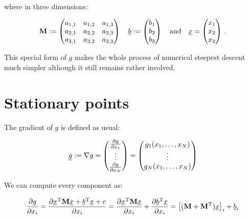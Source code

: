 \documentclass[a4paper,10pt]{article}
\begin{document}
where in three dimensions:

\begin{equation}
  \mathbf{M} :=
 \begin{pmatrix}
  a_{1,1} & a_{1,2} & a_{1,3} \\
  a_{2,1} & a_{2,2} & a_{2,3} \\
  a_{3,1} & a_{3,2} & a_{3,3} \\
 \end{pmatrix}
 \quad
 \underline{b} :=
 \begin{pmatrix}
  b_1 \\ b_2 \\ b_3
 \end{pmatrix}
 \quad \mathrm{and} \quad
 \underline{x} =
 \begin{pmatrix}
  x_1 \\ x_2 \\ x_3
 \end{pmatrix} \,.
\end{equation}

This special form of $g$ makes the whole process of numerical steepest
descent much simpler although it still remains rather involved.


\section{Stationary points}

The gradient of $g$ is defined as usual:

\begin{equation}
 \underline{g} := \nabla g =
 \begin{pmatrix}
  \frac{\partial g}{\partial x_1} \\
  \vdots \\
  \frac{\partial g}{\partial x_N}
 \end{pmatrix}
 =
  \begin{pmatrix}
  g_1(x_1, \hdots, x_N) \\
  \vdots \\
  g_N(x_1, \hdots, x_N)
 \end{pmatrix}
\end{equation}

We can compute every component as:

\begin{equation}
 \begin{split}
  \frac{\partial g}{\partial x_i}  = \frac{\partial \underline{x}{}^{\textnormal{T}} \mathbf{M} \underline{x} + \underline{b}{}^{\textnormal{T}} \underline{x} +c}{\partial x_i}
                  = \frac{\partial \underline{x}{}^{\textnormal{T}} \mathbf{M} \underline{x}}{\partial x_i} + \frac{\partial \underline{b}{}^{\textnormal{T}} \underline{x}}{\partial x_i}
                  = \left[(\mathbf{M}+\mathbf{M}{}^{\textnormal{T}}) \underline{x}\right]_{i} + \underline{b}_i
 \end{split}
\end{equation}
\end{document}
